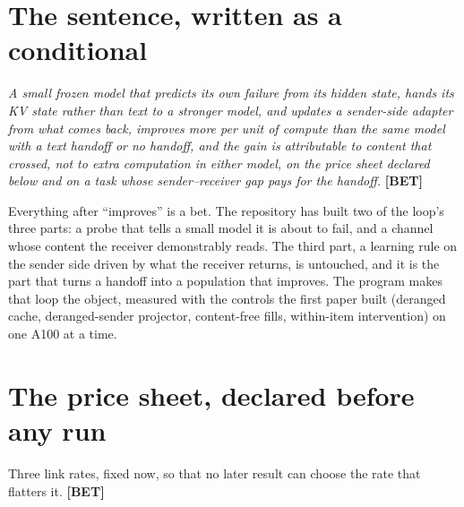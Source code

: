 \documentclass[11pt,a4paper]{report}
\newcommand{\BET}{\textcolor{betc}{\textbf{\scriptsize[BET]}}}
\newcommand{\mbet}{\marginnote{\BET}}
\begin{document}
\section{The sentence, written as a conditional}

\mbet \emph{A small frozen model that predicts its own failure from its hidden state, hands its KV state rather than text to a stronger model, and updates a sender-side adapter from what comes back, improves more per unit of compute than the same model with a text handoff or no handoff, and the gain is attributable to content that crossed, not to extra computation in either model, on the price sheet declared below and on a task whose sender--receiver gap pays for the handoff.} \BET

Everything after ``improves'' is a bet. The repository has built two of the loop's three parts: a probe that tells a small model it is about to fail, and a channel whose content the receiver demonstrably reads. The third part, a learning rule on the sender side driven by what the receiver returns, is untouched, and it is the part that turns a handoff into a population that improves. The program makes that loop the object, measured with the controls the first paper built (deranged cache, deranged-sender projector, content-free fills, within-item intervention) on one A100 at a time.


\section{The price sheet, declared before any run}

Three link rates, fixed now, so that no later result can choose the rate that flatters it. \BET
\end{document}
